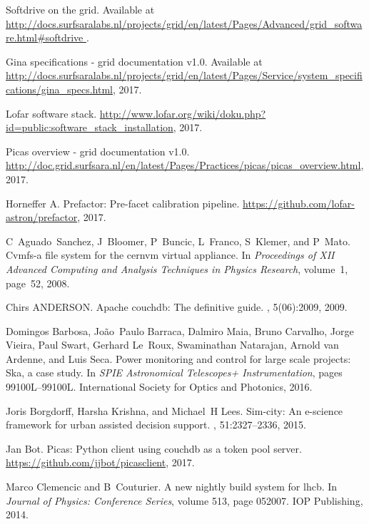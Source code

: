  \begin{thebibliography}{99}
Softdrive on the grid.
\newblock Available at
  \url{http://docs.surfsaralabs.nl/projects/grid/en/latest/Pages/Advanced/grid\_software.html\#softdrive
  }.

Gina specifications - grid documentation v1.0.
\newblock Available at
  \url{http://docs.surfsaralabs.nl/projects/grid/en/latest/Pages/Service/system\_specifications/gina\_specs.html},
  2017.

Lofar software stack.
\newblock
  \url{http://www.lofar.org/wiki/doku.php?id=public:software\_stack\_installation},
  2017.

Picas overview - grid documentation v1.0.
\newblock
  \url{http://doc.grid.surfsara.nl/en/latest/Pages/Practices/picas/picas\_overview.html},
  2017.

Horneffer A.
\newblock Prefactor: Pre-facet calibration pipeline.
\newblock \url{https://github.com/lofar-astron/prefactor}, 2017.

C~Aguado~Sanchez, J~Bloomer, P~Buncic, L~Franco, S~Klemer, and P~Mato.
\newblock Cvmfs-a file system for the cernvm virtual appliance.
\newblock In {\em Proceedings of XII Advanced Computing and Analysis Techniques
  in Physics Research}, volume~1, page~52, 2008.

Chirs ANDERSON.
\newblock Apache couchdb: The definitive guide.
, 5(06):2009,
  2009.

Domingos Barbosa, Jo{\~a}o~Paulo Barraca, Dalmiro Maia, Bruno Carvalho, Jorge
  Vieira, Paul Swart, Gerhard Le~Roux, Swaminathan Natarajan, Arnold van
  Ardenne, and Luis Seca.
\newblock Power monitoring and control for large scale projects: Ska, a case
  study.
\newblock In {\em SPIE Astronomical Telescopes+ Instrumentation}, pages
  99100L--99100L. International Society for Optics and Photonics, 2016.

Joris Borgdorff, Harsha Krishna, and Michael~H Lees.
\newblock Sim-city: An e-science framework for urban assisted decision support.
, 51:2327--2336, 2015.

Jan Bot.
\newblock Picas: Python client using couchdb as a token pool server.
\newblock \url{https://github.com/jjbot/picasclient}, 2017.

Marco Clemencic and B~Couturier.
\newblock A new nightly build system for lhcb.
\newblock In {\em Journal of Physics: Conference Series}, volume 513, page
  052007. IOP Publishing, 2014.


\end{thebibliography}
